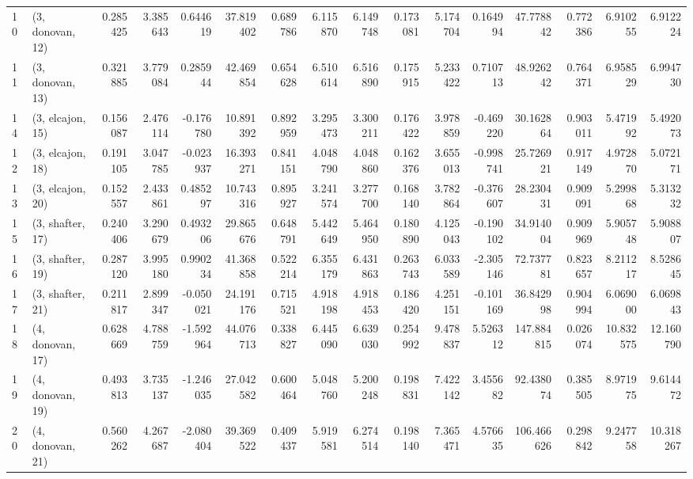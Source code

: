 \begin{tabular}{llrrrrrrrrrrrrrr}
10 &  (3, donovan, 12) &   0.285425 &  3.385643 &  0.644619 &  37.819402 &  0.689786 &   6.115870 &  6.149748 &  0.173081 &  5.174704 &  0.164994 &   47.778842 &  0.772386 &   6.910255 &   6.912224 \\
11 &  (3, donovan, 13) &   0.321885 &  3.779084 &  0.285944 &  42.469854 &  0.654628 &   6.510614 &  6.516890 &  0.175915 &  5.233422 &  0.710713 &   48.926242 &  0.764371 &   6.958529 &   6.994730 \\
14 &  (3, elcajon, 15) &   0.156087 &  2.476114 & -0.176780 &  10.891392 &  0.892959 &   3.295473 &  3.300211 &  0.176422 &  3.978859 & -0.469220 &   30.162864 &  0.903011 &   5.471992 &   5.492073 \\
12 &  (3, elcajon, 18) &   0.191105 &  3.047785 & -0.023937 &  16.393271 &  0.841151 &   4.048790 &  4.048860 &  0.162376 &  3.655013 & -0.998741 &   25.726921 &  0.917149 &   4.972870 &   5.072171 \\
13 &  (3, elcajon, 20) &   0.152557 &  2.433861 &  0.485297 &  10.743316 &  0.895927 &   3.241574 &  3.277700 &  0.168140 &  3.782864 & -0.376607 &   28.230431 &  0.909091 &   5.299868 &   5.313232 \\
15 &  (3, shafter, 17) &   0.240406 &  3.290679 &  0.493206 &  29.865676 &  0.648791 &   5.442649 &  5.464950 &  0.180890 &  4.125043 & -0.190102 &   34.914004 &  0.909969 &   5.905748 &   5.908807 \\
16 &  (3, shafter, 19) &   0.287120 &  3.995180 &  0.990234 &  41.368858 &  0.522214 &   6.355179 &  6.431863 &  0.263743 &  6.033589 & -2.305146 &   72.737781 &  0.823657 &   8.211217 &   8.528645 \\
17 &  (3, shafter, 21) &   0.211817 &  2.899347 & -0.050021 &  24.191176 &  0.715521 &   4.918198 &  4.918453 &  0.186420 &  4.251151 & -0.101169 &   36.842998 &  0.904994 &   6.069000 &   6.069843 \\
18 &  (4, donovan, 17) &   0.628669 &  4.788759 & -1.592964 &  44.076713 &  0.338827 &   6.445090 &  6.639030 &  0.254992 &  9.478837 &  5.526312 &  147.884815 &  0.026074 &  10.832575 &  12.160790 \\
19 &  (4, donovan, 19) &   0.493813 &  3.735137 & -1.246035 &  27.042582 &  0.600464 &   5.048760 &  5.200248 &  0.198831 &  7.422142 &  3.455682 &   92.438074 &  0.385505 &   8.971975 &   9.614472 \\
20 &  (4, donovan, 21) &   0.560262 &  4.267687 & -2.080404 &  39.369522 &  0.409437 &   5.919581 &  6.274514 &  0.198140 &  7.365471 &  4.576635 &  106.466626 &  0.298842 &   9.247758 &  10.318267 \\

\end{tabular}
